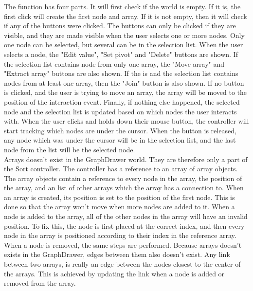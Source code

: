 The  function has four parts. It will first check if the world is empty. If it is, the first click will create the first node and array. If it is not empty, then it will check if any of the buttons were clicked. The buttons can only be clicked if they are visible, and they are made visible when the user selects one or more nodes. Only one node can be selected, but several can be in the selection list. When the user selects a node, the "Edit value", "Set pivot" and "Delete" buttons are shown. If the selection list contains node from only one array, the "Move array" and "Extract array" buttons are also shown. If the  is  and the selection list contains nodes from at least one array, then the "Join" button is also shown. If no button is clicked, and the user is trying to move an array, the array will be moved to the position of the interaction event. Finally, if nothing else happened, the selected node and the selection list is updated based on which nodes the user interacts with. When the user clicks and holds down their mouse button, the controller will start tracking which nodes are under the cursor. When the button is released, any node which was under the cursor will be in the selection list, and the last node from the list will be the selected node.
\\[11pt]
Arrays doesn't exist in the GraphDrawer world. They are therefore only a part of the Sort controller. The controller has a reference to an array of array objects. The array objects contain a reference to every node in the array, the position of the array, and an list of other arrays which the array has a connection to. When an array is created, its position is set to the position of the first node. This is done so that the array won't move when more nodes are added to it. When a node is added to the array, all of the other nodes in the array will have an invalid position. To fix this, the node is first placed at the correct index, and then every node in the array is positioned according to their index in the reference array. When a node is removed, the same steps are performed. Because arrays doesn't exists in the GraphDrawer, edges between them also doesn't exist. Any link between two arrays, is really an edge between the nodes closest to the center of the arrays. This is achieved by updating the link when a node is added or removed from the array.
\\[11pt]
